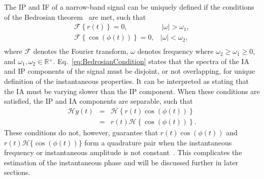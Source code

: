 \documentclass[a4paper]{IEEEtran}
\begin{document}
The IP and IF of a narrow-band signal can be uniquely defined if the conditions of the Bedrosian theorem~\cite{Bedrosian1963} are met, such that
\begin{equation}\label{eq:BedrosianCondition}
\begin{array}{*{20}{c}}
   {\mathcal{F}\left\{ {r\left( t \right)} \right\} = 0,} & {\,\left| \omega \right| > \omega_1,}  \\
   {\mathcal{F}\left\{ {\cos\left(\phi \left( t \right)\right)} \right\} = 0,} & {\left| \omega \right| < \omega_2,}  \\
\end{array}
\end{equation}
where $\mathcal{F}$ denotes the Fourier transform, $\omega$ denotes frequency where $\omega_2 \ge \omega_1 \ge 0$, and $\omega_1,\omega_2 \in \mathbb{R}{^ + }$. Eq.~\ref{eq:BedrosianCondition} states that the spectra of the IA and IP components of the signal must be disjoint, or not overlapping, for unique definition of the instantaneous properties. It can be interpreted as stating that the IA must be varying slower than the IP component. When these conditions are satisfied, the IP and IA components are separable, such that
\begin{eqnarray}\label{eq:SepAmpandPhase}
   \mathcal{H}y\left( t \right) &=& \mathcal{H}\left\{ {r\left( t \right)\cos \left( {\phi \left( t \right)} \right)} \right\} \nonumber \\
   &=& r\left( t \right)\mathcal{H}\left\{ {\cos \left( {\phi \left( t \right)} \right)} \right\}.
\end{eqnarray}
These conditions do not, however, guarantee that $r\left(t\right)\cos(\phi(t))$ and $r\left(t\right)\mathcal{H}\{\cos(\phi(t))\}$ form a quadrature pair when the instantaneous frequency or instantaneous amplitude is not constant~\cite{Nuttall1966}. This complicates the estimation of the instantaneous phase and will be discussed further in later sections. 
\end{document}
